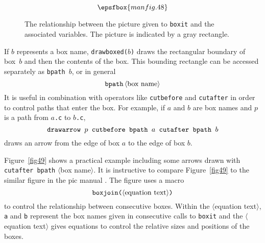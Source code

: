 \documentclass{article} %
\newcommand\descr[1]{{\langle\hbox{#1}\rangle}}
\newcommand\invisgap{\nobreak\hskip0pt\relax}
\newcommand\tdescr[1]{$\langle$\invisgap#1\invisgap$\rangle$}
\begin{document}
\begin{figure}[htp]
$$ \epsfbox{manfig.48} $$
\caption[How a {\tt boxit} picture relates to the associated variables]
        {The relationship between the picture given to {\tt boxit} and the
        associated variables.  The picture is indicated by a gray rectangle.}
\label{fig48}
\end{figure}

If $b$ represents a box name, {\tt drawboxed($b$)} draws the rectangular
boundary of box~$b$ and then the contents of the box.  This bounding
rectangle can be accessed separately as {\tt bpath~$b$}, or in
general\label{Dbpath}
$$ {\tt bpath}\, \descr{box name} $$
It is useful in combination with operators like
{\tt cutbefore} and {\tt cutafter}
in order to control paths that enter the box.
For example, if $a$ and $b$ are box names and $p$ is a path from $a${\tt.c}
to $b${\tt.c},
$$ \hbox{\tt drawarrow $p$ cutbefore bpath $a$ cutafter bpath $b$} $$
draws an arrow from the edge of box $a$ to the edge of box $b$.

Figure~\ref{fig49} shows a practical example including some arrows drawn
with {\tt cutafter bpath} \tdescr{box name}.  It is instructive to
compare Figure~\ref{fig49} to the similar figure in the pic manual
\cite{ke:pic}.  The figure uses a
macro\label{Dbxjoin}
$$ \hbox{\tt boxjoin(} \descr{equation text} \hbox{\tt )} $$
to control the relationship between consecutive boxes.  Within the
\tdescr{equation text}, {\tt a} and {\tt b} represent the box names given in
consecutive calls to {\tt boxit} and the \tdescr{equation text} gives equations
to control the relative sizes and positions of the boxes.
\end{document}
